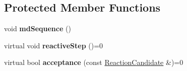 \subsection*{Protected Member Functions}
\begin{DoxyCompactItemize}
\item 
\mbox{\label{classSimulatorBase_a92300915ac3d7c0812f5390068a2c23d}} 
void {\bfseries md\+Sequence} ()
\item 
\mbox{\label{classSimulatorBase_af463a10b1c1c8c2df0b46e87f3d3dfac}} 
virtual void {\bfseries reactive\+Step} ()=0
\item 
\mbox{\label{classSimulatorBase_a0fcd514966117c48c810137e0177009c}} 
virtual bool {\bfseries acceptance} (const \mbox{\hyperlink{classReactionCandidate}{Reaction\+Candidate}} \&)=0
\end{DoxyCompactItemize}
